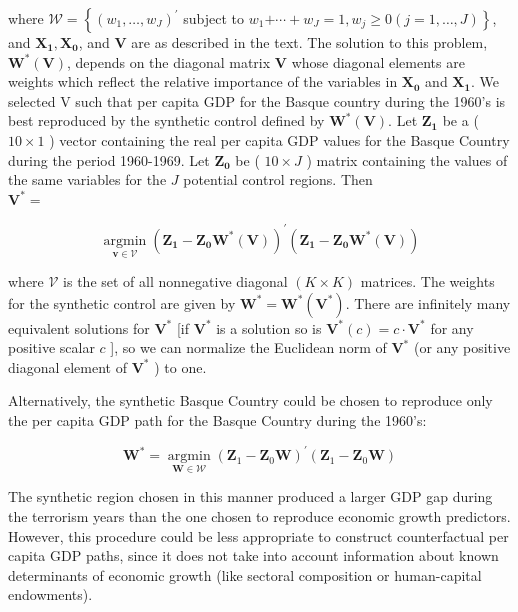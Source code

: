 \documentclass[10pt]{article}
\begin{document}
where $\mathcal{W}=\left\{\left(w_{1}, \ldots, w_{J}\right)^{\prime}\right.$ subject to $w_{1} \left.+\cdots+w_{J}=1, w_{j} \geq 0(j=1, \ldots, J)\right\}$, and $\mathbf{X}_{\mathbf{1}}, \mathbf{X}_{\mathbf{0}}$, and $\mathbf{V}$ are as described in the text. The solution to this problem, $\mathbf{W}^{*}(\mathbf{V})$, depends on the diagonal matrix $\mathbf{V}$ whose diagonal elements are weights which reflect the relative importance of the variables in $\mathbf{X}_{\mathbf{0}}$ and $\mathbf{X}_{\mathbf{1}}$. We selected V such that per capita GDP for the Basque country during the 1960's is best reproduced by the synthetic control defined by $\mathbf{W}^{*}(\mathbf{V})$. Let $\mathbf{Z}_{\mathbf{1}}$ be a ( $10 \times 1$ ) vector containing the real per capita GDP values for the Basque Country during the period 1960-1969. Let $\mathbf{Z}_{\mathbf{0}}$ be ( $10 \times J$ ) matrix containing the values of the same variables for the $J$ potential control regions. Then\\
$\mathbf{V}^{*}=$

$$
\underset{\mathbf{v} \in \mathcal{V}}{\operatorname{argmin}}\left(\mathbf{Z}_{\mathbf{1}}-\mathbf{Z}_{\mathbf{0}} \mathbf{W}^{*}(\mathbf{V})\right)^{\prime}\left(\mathbf{Z}_{\mathbf{1}}-\mathbf{Z}_{\mathbf{0}} \mathbf{W}^{*}(\mathbf{V})\right)
$$

where $\mathcal{V}$ is the set of all nonnegative diagonal $(K \times K)$ matrices. The weights for the synthetic control are given by $\mathbf{W}^{*}=\mathbf{W}^{*}\left(\mathbf{V}^{*}\right)$. There are infinitely many equivalent solutions for $\mathbf{V}^{*}$ [if $\mathbf{V}^{*}$ is a solution so is $\mathbf{V}^{*}(c)=c \cdot \mathbf{V}^{*}$ for any positive scalar $c$ ], so we can normalize the Euclidean norm of $\mathbf{V}^{*}$ (or any positive diagonal element of $\mathbf{V}^{*}$ ) to one.

Alternatively, the synthetic Basque Country could be chosen to reproduce only the per capita GDP path for the Basque Country during the 1960's:

$$
\mathbf{W}^{*}=\underset{\mathbf{W} \in \mathcal{W}}{\operatorname{argmin}}\left(\mathbf{Z}_{1}-\mathbf{Z}_{0} \mathbf{W}\right)^{\prime}\left(\mathbf{Z}_{1}-\mathbf{Z}_{0} \mathbf{W}\right)
$$

The synthetic region chosen in this manner produced a larger GDP gap during the terrorism years than the one chosen to reproduce economic growth predictors. However, this procedure could be less appropriate to construct counterfactual per capita GDP paths, since it does not take into account information about known determinants of economic growth (like sectoral composition or human-capital endowments).
\end{document}
